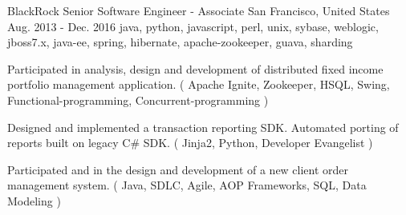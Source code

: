\cventry
    {BlackRock} %
    {Senior Software Engineer - Associate} %
    {San Francisco, United States} %
    {Aug. 2013 - Dec. 2016} %
    {java, python, javascript, perl, unix, sybase, weblogic, jboss7.x, java-ee, spring, hibernate, apache-zookeeper, guava, sharding}%
    {
        \vspace{-4.0mm}
    \begin{cvitems} %
        \item { Participated in analysis, design and development of distributed fixed income portfolio management application. ( Apache Ignite, Zookeeper, HSQL, Swing, Functional-programming, Concurrent-programming )}
        \item { Designed and implemented a transaction reporting SDK. Automated porting of reports built on legacy C\# SDK. ( Jinja2, Python, Developer Evangelist )}
        \item { Participated and in the design and development of a new client order management system. ( Java, SDLC, Agile, AOP Frameworks, SQL, Data Modeling )}
    \end{cvitems}
    }
